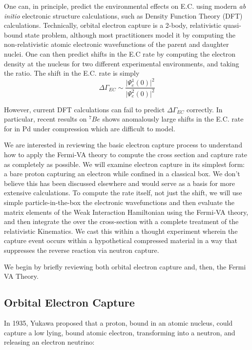 \documentclass[%
 aip,
 jmp,%
 amsmath,amssymb,
 reprint,%
]{revtex4-1}
\begin{document}
One can, in principle, predict the environmental effects on E.C. using modern \emph{ab initio} electronic structure calculations, such as Density Function Theory (DFT) calculations.\cite{PhysRevC.71.025801}   Technically, orbital electron capture is a 2-body, relativistic quasi-bound state problem, although most practitioners model it by computing the non-relativistic atomic electronic wavefunctions of the parent and daughter nuclei. One can then predict  shifts in the E.C rate by  computing the electron density at the nucleus for two different experimental environments, and taking the ratio.  The shift in the E.C. rate is simply 
$$\Delta\Gamma_{EC}\sim\dfrac{\big\vert\Psi^{1}_{e}(0)\big\vert^{2}} {\big\vert\Psi^{2}_{e}(0)\big\vert^{2}} $$

However, current DFT calculations can fail to predict $\Delta\Gamma_{EC}$ correctly.    In particular, recent results on $^{7}Be$ shows anomalously large shifts in the E.C. rate for in Pd under compression which are difficult to model.\cite{PhysRevC.101.035801}

We are interested in reviewing the basic  electron capture process to  understand how to apply the Fermi-VA theory to compute the cross section and capture rate as completely as possible.  We will examine electron capture in its simplest form:  a bare proton capturing an electron while confined in a classical box.   We don't believe this has been discussed elsewhere and would serve as a basis for more extensive calculations.    To compute the rate itself, not just the shift,  we will use simple particle-in-the-box the electronic wavefunctions and then evaluate the matrix elements of the Weak Interaction Hamiltonian using the Fermi-VA theory, and then integrate the over the cross-section with a complete treatment of the relativistic Kinematics.  We cast this within a thought experiment wherein the capture event occurs within a hypothetical compressed material in a way that suppresses the reverse reaction via neutron capture.

We begin by briefly reviewing both orbital electron capture and, then, the Fermi VA Theory.

\subsection{Orbital Electron Capture}
In 1935, Yukawa proposed that a proton, bound in an atomic nucleus,  could capture a low lying, bound atomic electron, transforming into a neutron, and releasing an electron neutrino:
\end{document}
